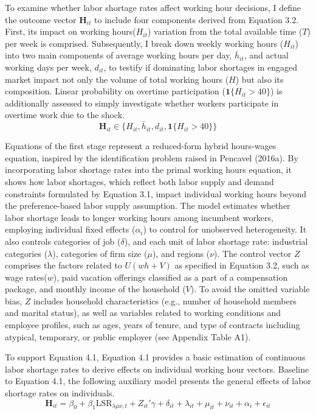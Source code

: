 \documentclass[
  12pt,
]{article}
\begin{document}
To examine whether labor shortage rates affect working hour decisions, I
define the outcome vector \(\mathbf{H}_{it}\) to include four components
derived from Equation 3.2. First, its impact on working
hours(\(H_{it}\)) variation from the total available time (\(T\)) per
week is comprised. Subsequently, I break down weekly working hours
(\(H_{it}\)) into two main components of average working hours per day,
\(\bar{h}_{it}\), and actual working days per week, \(d_{it}\), to
testify if dominating labor shortages in engaged market impact not only
the volume of total working hours (\(H\)) but also its composition.
Linear probability on overtime participation
(\(\mathbf{1}\{H_{it} > 40\}\)) is additionally assessed to simply
investigate whether workers participate in overtime work due to the
shock. \[
\mathbf{H}_{it} \in \{H_{it}, \bar{h}_{it}, d_{it}, \mathbf{1}\{H_{it} > 40\} \}
\]

Equations of the first stage represent a reduced-form hybrid hours-wages
equation, inspired by the identification problem raised in Pencavel
(2016a). By incorporating labor shortage rates into the primal working
hours equation, it shows how labor shortages, which reflect both labor
supply and demand constraints formulated by Equation 3.1, impact
individual working hours beyond the preference-based labor supply
assumption. The model estimates whether labor shortage leads to longer
working hours among incumbent workers, employing individual fixed
effects (\(\alpha_i\)) to control for unobserved heterogeneity. It also
controls categories of job (\(\delta\)), and each unit of labor shortage
rate: industrial categories (\(\lambda\)), categories of firm size
(\(\mu\)), and regions (\(\nu\)). The control vector \(Z\) comprises the
factors related to \(U(wh+V)\) as specified in Equation 3.2, such as
wage rates(\(w\)), paid vacation offerings classified as a part of a
compensation package, and monthly income of the household (\(V\)). To
avoid the omitted variable bias, \(Z\) includes household
characteristics (e.g., number of household members and marital status),
as well as variables related to working conditions and employee
profiles, such as ages, years of tenure, and type of contracts including
atypical, temporary, or public employer (see Appendix Table A1).

To support Equation 4.1, Equation 4.1 provides a basic estimation of
continuous labor shortage rates to derive effects on individual working
hour vectors. Baseline to Equation 4.1, the following auxiliary model
presents the general effects of labor shortage rates on individuals. \[
\mathbf{H}_{it}=\beta_0 + \beta_1 \text{LSR}_{\lambda\mu\nu,t} + Z_{it}' \gamma + \delta_{it} + \lambda_{it} + \mu_{it} + \nu_{it} +\alpha_i + \epsilon_{it}
\tag{4.1}
\]
\end{document}
